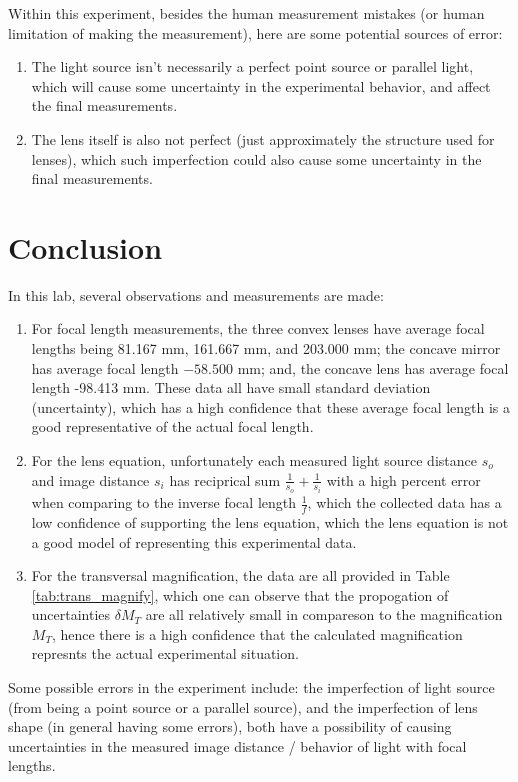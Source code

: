 \documentclass{article}
\begin{document}
Within this experiment, besides the human measurement mistakes (or human limitation of making the measurement), here are some potential sources of error:
\begin{enumerate}
    \item The light source isn't necessarily a perfect point source or parallel light, which will cause some uncertainty in the experimental behavior, and affect the final measurements.
    \item The lens itself is also not perfect (just approximately the structure used for lenses), which such imperfection could also cause some uncertainty in the final measurements.
\end{enumerate}

\hfil

\hfil

\section{Conclusion}
In this lab, several observations and measurements are made:
\begin{enumerate}
    \item For focal length measurements, the three convex lenses have average focal lengths being 81.167 mm, 161.667 mm, and 203.000 mm; the concave mirror has average focal length $-58.500$ mm; and, the concave lens has average focal length -98.413 mm. These data all have small standard deviation (uncertainty), which has a high confidence that these average focal length is a good representative of the actual focal length.
    
    \hfil

    \item For the lens equation, unfortunately each measured light source distance $s_o$ and image distance $s_i$ has reciprical sum $\frac{1}{s_o}+\frac{1}{s_i}$ with a high percent error when comparing to the inverse focal length $\frac{1}{f}$, which the collected data has a low confidence of supporting the lens equation, which the lens equation is not a good model of representing this experimental data.
    
    \hfil

    \item For the transversal magnification, the data are all provided in Table \ref{tab:trans_magnify}, which one can observe that the propogation of uncertainties $\delta M_T$ are all relatively small in compareson to the magnification $M_T$, hence there is a high confidence that the calculated magnification represnts the actual experimental situation.
\end{enumerate}

Some possible errors in the experiment include: the imperfection of light source (from being a point source or a parallel source), and the imperfection of lens shape (in general having some errors), both have a possibility of causing uncertainties in the measured image distance / behavior of light with focal lengths.
\end{document}
